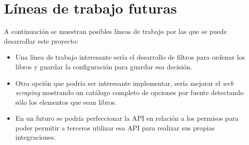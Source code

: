 \section{Líneas de trabajo futuras}
A continuación se muestran posibles líneas de trabajo por las que se puede desarrollar este proyecto:
\begin{itemize}
    \item Una línea de trabajo interesante sería el desarrollo de filtros para ordenar los libros y guardar la configuración para guardar esa decisión.
    \item Otra opción que podría ser interesante implementar, sería mejorar el \textit{web scraping}  mostrando un catálogo completo de opciones por fuente detectando sólo los elementos que sean libros.
    \item En un futuro se podría perfeccionar la API en relación a los permisos para poder permitir a terceros utilizar esa API para realizar sus propias integraciones.
\end{itemize}